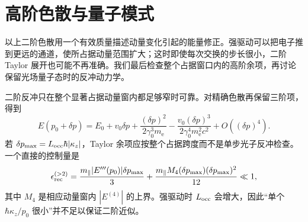 


\section{高阶色散与量子模式}\label{subsec:higher-dispersion-quantum-mode-dp19}

以上二阶色散用一个有效质量描述动量变化引起的能量修正。强驱动可以把电子推到更远的通道，使所占据动量范围扩大；这时即使每次交换的步长很小，二阶 Taylor 展开也可能不再准确。我们最后检查整个占据窗口内的高阶余项，再讨论保留光场量子态时的反冲动力学。

二阶反冲只在整个显著占据动量窗内都足够窄时可靠。对精确色散再保留三阶项，得到
\begin{equation}
E(p_0+\delta p)
=E_0+v_0\delta p
+\frac{(\delta p)^2}{2\gamma_0^3m_{\mathrm e}}
-\frac{v_0(\delta p)^3}{2\gamma_0^4m_{\mathrm e}^2c^2}
+O((\delta p)^4).
\label{eq:dispersion_to_cubic}
\end{equation}
若 $\delta p_{\max}=L_{\rm occ}\hbar|\kappa_z|$，Taylor 余项应按整个占据跨度而不是单步光子反冲检查。一个直接的控制量是
\begin{equation}
{
\epsilon_{\rm rec}^{(>2)}
=\frac{m_\parallel|E'''(p_0)|\delta p_{\max}}{3}
+\frac{m_\parallel M_4(\delta p_{\max})(\delta p_{\max})^2}{12}
\ll1,}
\label{eq:recoil_taylor_remainder_control}
\end{equation}
其中 $M_4$ 是相应动量窗内 $|E^{(4)}|$ 的上界。强驱动时 $L_{\rm occ}$ 会增大，因此“单个 $\hbar \kappa_z/p_0$ 很小”并不足以保证二阶近似。

